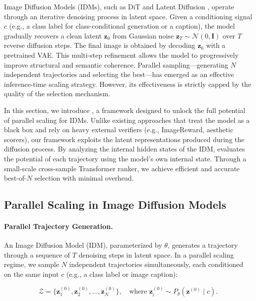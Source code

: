 \documentclass{article}
\newcommand{\method}{\text{Diffusion Ranker}\xspace}
\begin{document}
Image Diffusion Models (IDMs), such as DiT \citep{peebles2023dit} and Latent Diffusion \citep{rombach2022ldm}, operate through an iterative denoising process in latent space. Given a conditioning signal $c$ (e.g., a class label for class-conditional generation or a caption), the model gradually recovers a clean latent $\mathbf{z}_0$ from Gaussian noise $\mathbf{z}_T \sim \mathcal{N}(0, \mathbf{I})$ over $T$ reverse diffusion steps. The final image is obtained by decoding $\mathbf{z}_0$ with a pretrained VAE. This multi-step refinement allows the model to progressively improve structural and semantic coherence. Parallel sampling---generating $N$ independent trajectories and selecting the best---has emerged as an effective inference-time scaling strategy. However, its effectiveness is strictly capped by the quality of the selection mechanism.

In this section, we introduce \method, a framework designed to unlock the full potential of parallel scaling for IDMs. Unlike existing approaches that treat the model as a black box and rely on heavy external verifiers (e.g., ImageReward, aesthetic scorers), our framework exploits the latent representations produced during the diffusion process. By analyzing the internal hidden states of the IDM, \method evaluates the potential of each trajectory using the model's own internal state. Through a small-scale cross-sample Transformer ranker, we achieve efficient and accurate best-of-$N$ selection with minimal overhead.

\subsection{Parallel Scaling in Image Diffusion Models}

\paragraph{Parallel Trajectory Generation.}

An Image Diffusion Model (IDM), parameterized by $\theta$, generates a trajectory through a sequence of $T$ denoising steps in latent space. In a parallel scaling regime, we sample $N$ independent trajectories simultaneously, each conditioned on the same input $c$ (e.g., a class label or image caption):

\begin{equation}
    \mathcal{Z} = \{\mathbf{z}_1^{(0)}, \mathbf{z}_2^{(0)}, \ldots, \mathbf{z}_N^{(0)}\}, \quad \text{where } \mathbf{z}_i^{(0)} \sim P_{\theta}(\mathbf{z}^{(0)} \mid c).
\end{equation}
\end{document}
